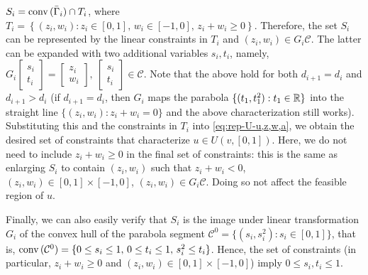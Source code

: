 	$S_i = \textnormal{conv}\,(\bar{\Gamma}_i) \cap T_i$,
	where 
	$T_i = \left\{ (z_i, w_i): z_i \in [0,1],\, w_i \in [-1,0],\, z_i + w_i \geq 0 \right\}$.
	Therefore, the set $S_i$ can be represented by the linear constraints in $T_i$ and $ (z_i, w_i)\in G_i \mathcal{C}$. 
	The latter can be expanded with two additional variables $s_i, t_i$, namely, 
	$G_i \left[\begin{smallmatrix}
		s_i \\ t_i
	\end{smallmatrix}\right] = \left[\begin{smallmatrix}
		z_i \\ w_i
	\end{smallmatrix}\right],\ \left[\begin{smallmatrix}
		s_i \\ t_i
	\end{smallmatrix}\right] \in \mathcal{C}$.
	Note that the above hold for both $d_{i+1} = d_i$ and $d_{i+1} > d_i$ (if $d_{i+1} = d_i$, then $G_i$ maps the parabola $\{(t_1, t_1^2): t_1 \in \mathbb{R} \}$ into the straight line $\{ (z_i, w_i): z_i + w_i = 0 \}$ and the above characterization still works).
	Substituting this and the constraints in $T_i$ into \eqref{eq:rep-U-u,z,w,a}, we obtain the desired set of constraints that characterize $u\in U(v, [0,1])$.
	Here, we do not need to include $z_i + w_i \geq 0$ in the final set of constraints: this is the same as enlarging $S_i$ to contain $(z_i, w_i)$ such that $z_i + w_i < 0$, $(z_i, w_i)\in [0,1]\times [-1, 0]$, $(z_i, w_i) \in G_i \mathcal{C}$. Doing so not affect the feasible region of $u$.

	Finally, we can also easily verify that $S_i$ is the image under linear transformation $G_i$ of the convex hull of the parabola segment $\mathcal{C}^0 = \{ (s_i, s_i^2): s_i \in [0,1] \}$, that is, 
	$\textnormal{conv}\,(\mathcal{C}^0) = \{ 0\leq s_i \leq 1,\, 0 \leq t_i \leq 1,\, s_i^2 \leq t_i \}$.
	Hence, the set of constraints (in particular, $z_i + w_i \geq 0$ and $(z_i,w_i)\in [0,1] \times [-1,0]$) imply
	$0\leq s_i, t_i \leq 1$.

